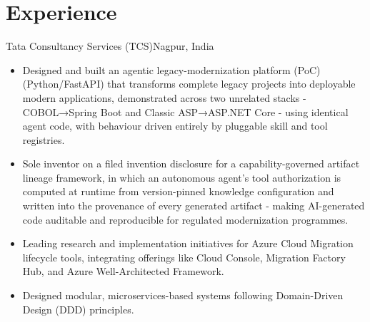 \documentclass[11pt,a4paper,sans]{moderncv}
\begin{document}
\section{Experience} 
{Tata Consultancy Services (TCS)}{Nagpur, India}{}{
\begin{itemize} 
    \item Designed and built an agentic legacy-modernization platform (PoC) (Python/FastAPI) that transforms complete legacy projects into deployable modern applications, demonstrated across two unrelated stacks - COBOL→Spring Boot and Classic ASP→ASP.NET Core - using identical agent code, with behaviour driven entirely by pluggable skill and tool registries.
    \item Sole inventor on a filed invention disclosure for a capability-governed artifact lineage framework, in which an autonomous agent's tool authorization is computed at runtime from version-pinned knowledge configuration and written into the provenance of every generated artifact - making AI-generated code auditable and reproducible for regulated modernization programmes.
    \item Leading research and implementation initiatives for Azure Cloud Migration lifecycle tools, integrating offerings like Cloud Console, Migration Factory Hub, and Azure Well-Architected Framework.
    \item Designed modular, microservices-based systems following Domain-Driven Design (DDD) principles. 
\end{itemize}}
\vspace{0.5em}
\vspace{0.5em}
\end{document}
